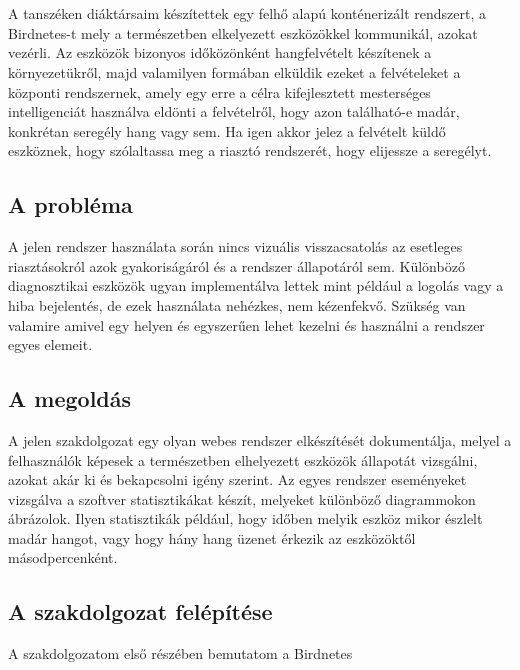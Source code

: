 \chapter{\bevezetes}
A tanszéken diáktársaim készítettek egy felhő alapú konténerizált rendszert, a Birdnetes-t
mely a természetben elkelyezett eszközökkel kommunikál, azokat vezérli.
Az eszközök bizonyos időközönként hangfelvételt készítenek a környezetükről,
majd valamilyen formában elküldik ezeket a felvételeket a központi rendszernek,
amely egy erre a célra kifejlesztett mesterséges intelligenciát használva eldönti
a felvételről, hogy azon található-e madár, konkrétan seregély hang vagy sem.
Ha igen akkor jelez a felvételt küldő eszköznek, hogy szólaltassa meg a riasztó
rendszerét, hogy elijessze a seregélyt.

\section{A probléma}
A jelen rendszer használata során nincs vizuális visszacsatolás az esetleges riasztásokról azok gyakoriságáról
és a rendszer állapotáról sem. Különböző diagnosztikai eszközök ugyan implementálva lettek mint például
a logolás vagy a hiba bejelentés, de ezek használata nehézkes, nem kézenfekvő. 
Szükség van valamire amivel egy helyen és egyszerűen lehet kezelni és használni a rendszer egyes elemeit.

\section{A megoldás}
A jelen szakdolgozat egy olyan webes rendszer elkészítését dokumentálja, melyel a felhasználók képesek
a természetben elhelyezett eszközök állapotát vizsgálni, azokat akár ki és bekapcsolni igény szerint.
Az egyes rendszer eseményeket vizsgálva a szoftver statisztikákat készít, melyeket különböző diagrammokon ábrázolok.
Ilyen statisztikák például, hogy időben melyik eszköz mikor észlelt madár hangot, vagy hogy hány hang üzenet érkezik
az eszközöktől másodpercenként.


\section{A szakdolgozat felépítése}
A szakdolgozatom első részében bemutatom a Birdnetes 